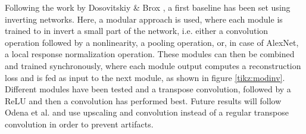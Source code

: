 \documentclass{article}
\begin{document}
Following the work by Dosovitskiy \& Brox \cite{dobro_inverting}, a first baseline has been set using inverting networks. Here, a modular approach is used, where each module is trained to in invert a small part of the network, i.e. either a convolution operation followed by a nonlinearity, a pooling operation, or, in case of AlexNet, a local response normalization operation. These modules can then be combined and trained synchronously, where each module output computes a reconstruction loss and is fed as input to the next module, as shown in figure \ref{tikz:modinv}. Different modules have been tested and a transpose convolution, followed by a ReLU and then a convolution has performed best. Future results will follow Odena et al. \cite{odena} and use upscaling and convolution instead of a regular transpose convolution in order to prevent artifacts.
\end{document}
